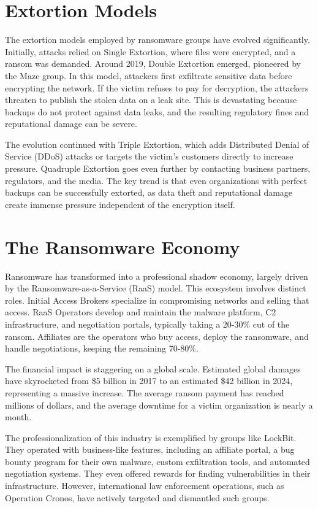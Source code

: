 \documentclass[12pt,a4paper]{article}
\begin{document}
\section{Extortion Models}
The extortion models employed by ransomware groups have evolved significantly. Initially, attacks relied on Single Extortion, where files were encrypted, and a ransom was demanded. Around 2019, Double Extortion emerged, pioneered by the Maze group. In this model, attackers first exfiltrate sensitive data before encrypting the network. If the victim refuses to pay for decryption, the attackers threaten to publish the stolen data on a leak site. This is devastating because backups do not protect against data leaks, and the resulting regulatory fines and reputational damage can be severe.

The evolution continued with Triple Extortion, which adds Distributed Denial of Service (DDoS) attacks or targets the victim's customers directly to increase pressure. Quadruple Extortion goes even further by contacting business partners, regulators, and the media. The key trend is that even organizations with perfect backups can be successfully extorted, as data theft and reputational damage create immense pressure independent of the encryption itself.

\section{The Ransomware Economy}
Ransomware has transformed into a professional shadow economy, largely driven by the Ransomware-as-a-Service (RaaS) model. This ecosystem involves distinct roles. Initial Access Brokers specialize in compromising networks and selling that access. RaaS Operators develop and maintain the malware platform, C2 infrastructure, and negotiation portals, typically taking a 20-30\% cut of the ransom. Affiliates are the operators who buy access, deploy the ransomware, and handle negotiations, keeping the remaining 70-80\%.

The financial impact is staggering on a global scale. Estimated global damages have skyrocketed from \$5 billion in 2017 to an estimated \$42 billion in 2024, representing a massive increase. The average ransom payment has reached millions of dollars, and the average downtime for a victim organization is nearly a month.

The professionalization of this industry is exemplified by groups like LockBit. They operated with business-like features, including an affiliate portal, a bug bounty program for their own malware, custom exfiltration tools, and automated negotiation systems. They even offered rewards for finding vulnerabilities in their infrastructure. However, international law enforcement operations, such as Operation Cronos, have actively targeted and dismantled such groups.
\end{document}
